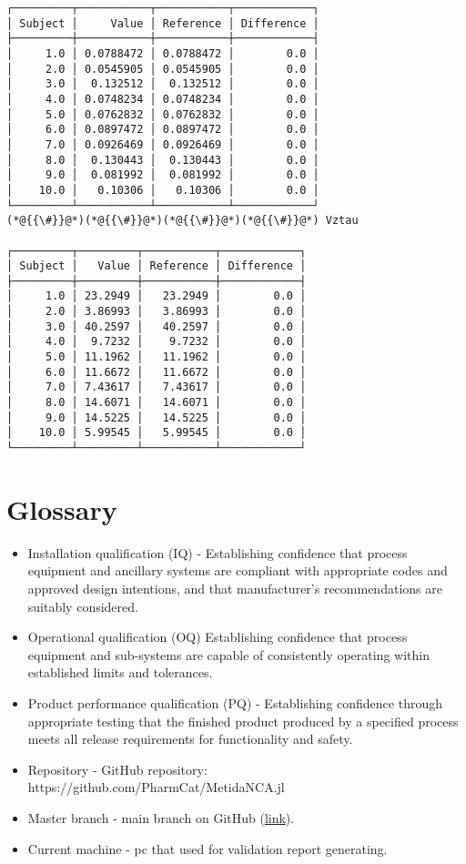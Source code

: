 \documentclass[12pt,a4paper]{article}
\begin{document}
\begin{lstlisting}
┌─────────┬───────────┬───────────┬────────────┐
│ Subject │     Value │ Reference │ Difference │
├─────────┼───────────┼───────────┼────────────┤
│     1.0 │ 0.0788472 │ 0.0788472 │        0.0 │
│     2.0 │ 0.0545905 │ 0.0545905 │        0.0 │
│     3.0 │  0.132512 │  0.132512 │        0.0 │
│     4.0 │ 0.0748234 │ 0.0748234 │        0.0 │
│     5.0 │ 0.0762832 │ 0.0762832 │        0.0 │
│     6.0 │ 0.0897472 │ 0.0897472 │        0.0 │
│     7.0 │ 0.0926469 │ 0.0926469 │        0.0 │
│     8.0 │  0.130443 │  0.130443 │        0.0 │
│     9.0 │  0.081992 │  0.081992 │        0.0 │
│    10.0 │   0.10306 │   0.10306 │        0.0 │
└─────────┴───────────┴───────────┴────────────┘
(*@{{\#}}@*)(*@{{\#}}@*)(*@{{\#}}@*)(*@{{\#}}@*) Vztau

┌─────────┬─────────┬───────────┬────────────┐
│ Subject │   Value │ Reference │ Difference │
├─────────┼─────────┼───────────┼────────────┤
│     1.0 │ 23.2949 │   23.2949 │        0.0 │
│     2.0 │ 3.86993 │   3.86993 │        0.0 │
│     3.0 │ 40.2597 │   40.2597 │        0.0 │
│     4.0 │  9.7232 │    9.7232 │        0.0 │
│     5.0 │ 11.1962 │   11.1962 │        0.0 │
│     6.0 │ 11.6672 │   11.6672 │        0.0 │
│     7.0 │ 7.43617 │   7.43617 │        0.0 │
│     8.0 │ 14.6071 │   14.6071 │        0.0 │
│     9.0 │ 14.5225 │   14.5225 │        0.0 │
│    10.0 │ 5.99545 │   5.99545 │        0.0 │
└─────────┴─────────┴───────────┴────────────┘
\end{lstlisting}


\section{Glossary}
\begin{itemize}
\item Installation qualification (IQ) - Establishing confidence that process equipment and ancillary systems are compliant with appropriate codes and approved design intentions, and that manufacturer's recommendations are suitably considered.


\item Operational qualification (OQ) Establishing confidence that process equipment and sub-systems are capable of consistently operating within established limits and tolerances.


\item Product performance qualification (PQ) - Establishing confidence through appropriate testing that the finished product produced by a specified process meets all release requirements for functionality and safety.


\item Repository - GitHub repository: https://github.com/PharmCat/MetidaNCA.jl


\item Master branch - main branch on GitHub (\href{https://github.com/PharmCat/MetidaNCA.jl/tree/main}{link}).


\item Current machine - pc that used for validation report generating.

\end{itemize}
\end{document}
